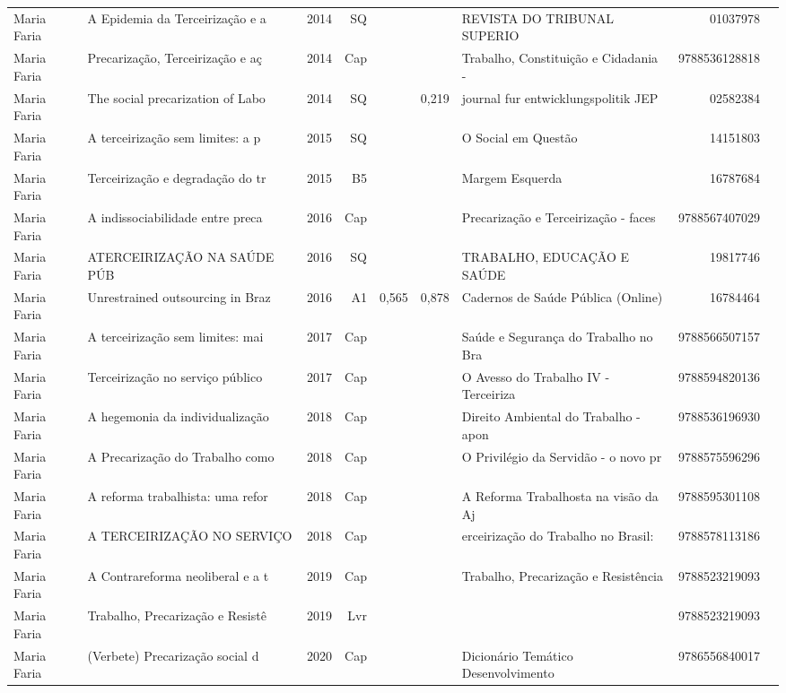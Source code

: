 \documentclass[12pt,brazil]{article}\usepackage[]{graphicx}\usepackage[]{xcolor}
\begin{document}
\begin{longtable}{lllrrllrr}
Maria Faria & A Epidemia da Terceirização e a  & 2014 & SQ &  &  & REVISTA DO TRIBUNAL SUPERIO & 01037978 \\
\rowcolor{coautr}Maria Faria & Precarização, Terceirização e aç & 2014 & Cap &  &  & Trabalho, Constituição e Cidadania - & 9788536128818 \\
Maria Faria & The social precarization of Labo & 2014 & SQ &  & 0,219 & journal fur entwicklungspolitik JEP & 02582384 \\
Maria Faria & A terceirização sem limites: a p & 2015 & SQ &  &  & O Social em Questão & 14151803 \\
Maria Faria & Terceirização e degradação do tr & 2015 & B5 &  &  & Margem Esquerda & 16787684 \\
Maria Faria & A indissociabilidade entre preca & 2016 & Cap &  &  & Precarização e Terceirização - faces & 9788567407029 \\
Maria Faria & ATERCEIRIZAÇÃO NA SAÚDE PÚB & 2016 & SQ &  &  & TRABALHO, EDUCAÇÃO E SAÚDE  & 19817746 \\
Maria Faria & Unrestrained outsourcing in Braz & 2016 & A1 & 0,565 & 0,878 & Cadernos de Saúde Pública (Online) & 16784464 \\
Maria Faria & A terceirização sem limites: mai & 2017 & Cap &  &  & Saúde e Segurança do Trabalho no Bra & 9788566507157 \\
Maria Faria & Terceirização no serviço público & 2017 & Cap &  &  & O Avesso do Trabalho IV - Terceiriza & 9788594820136 \\
Maria Faria & A hegemonia da individualização  & 2018 & Cap &  &  & Direito Ambiental do Trabalho - apon & 9788536196930 \\
Maria Faria & A Precarização do Trabalho como  & 2018 & Cap &  &  & O Privilégio da Servidão - o novo pr & 9788575596296 \\
Maria Faria & A reforma trabalhista: uma refor & 2018 & Cap &  &  & A Reforma Trabalhosta na visão da Aj & 9788595301108 \\
Maria Faria & A TERCEIRIZAÇÃO NO SERVIÇO  & 2018 & Cap &  &  & erceirização do Trabalho no Brasil:  & 9788578113186 \\
\rowcolor{capdup}Maria Faria & A Contrareforma neoliberal e a t & 2019 & Cap &  &  & Trabalho, Precarização e Resistência & 9788523219093 \\
Maria Faria & Trabalho, Precarização e Resistê & 2019 & Lvr &  &  &  & 9788523219093 \\
Maria Faria & (Verbete)  Precarização social d & 2020 & Cap &  &  & Dicionário Temático Desenvolvimento  & 9786556840017 \\

\end{longtable}
\end{document}
